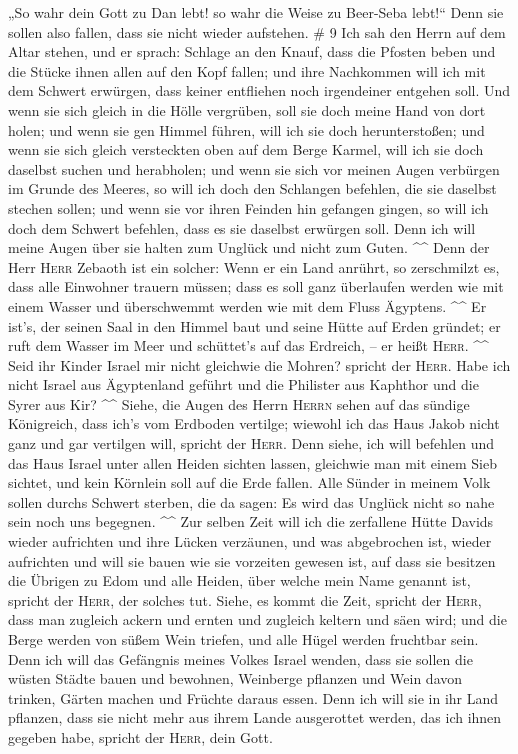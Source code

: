 „So wahr dein Gott zu Dan lebt! so wahr die Weise zu Beer-Seba lebt!{}``
Denn sie sollen also fallen, dass sie nicht wieder aufstehen. \# 9
 Ich sah den Herrn auf dem Altar stehen, und er sprach:
Schlage an den Knauf, dass die Pfosten beben und die Stücke ihnen allen
auf den Kopf fallen; und ihre Nachkommen will ich mit dem Schwert
erwürgen, dass keiner entfliehen noch irgendeiner entgehen soll.
 Und wenn sie sich gleich in die Hölle vergrüben, soll sie
doch meine Hand von dort holen; und wenn sie gen Himmel führen, will ich
sie doch herunterstoßen;  und wenn sie sich gleich
versteckten oben auf dem Berge Karmel, will ich sie doch daselbst suchen
und herabholen; und wenn sie sich vor meinen Augen verbürgen im Grunde
des Meeres, so will ich doch den Schlangen befehlen, die sie daselbst
stechen sollen;  und wenn sie vor ihren Feinden hin
gefangen gingen, so will ich doch dem Schwert befehlen, dass es sie
daselbst erwürgen soll. Denn ich will meine Augen über sie halten zum
Unglück und nicht zum Guten. \^{}\^{}  Denn der Herr
\textsc{Herr} Zebaoth ist ein solcher: Wenn er ein Land anrührt, so
zerschmilzt es, dass alle Einwohner trauern müssen; dass es soll ganz
überlaufen werden wie mit einem Wasser und überschwemmt werden wie mit
dem Fluss Ägyptens. \^{}\^{}  Er ist's, der seinen Saal in
den Himmel baut und seine Hütte auf Erden gründet; er ruft dem Wasser im
Meer und schüttet's auf das Erdreich, -- er heißt \textsc{Herr}.
\^{}\^{}  Seid ihr Kinder Israel mir nicht gleichwie die
Mohren? spricht der \textsc{Herr}. Habe ich nicht Israel aus Ägyptenland
geführt und die Philister aus Kaphthor und die Syrer aus Kir? \^{}\^{}
 Siehe, die Augen des Herrn \textsc{Herrn} sehen auf das
sündige Königreich, dass ich's vom Erdboden vertilge; wiewohl ich das
Haus Jakob nicht ganz und gar vertilgen will, spricht der \textsc{Herr}.
 Denn siehe, ich will befehlen und das Haus Israel unter
allen Heiden sichten lassen, gleichwie man mit einem Sieb sichtet, und
kein Körnlein soll auf die Erde fallen.  Alle Sünder in
meinem Volk sollen durchs Schwert sterben, die da sagen: Es wird das
Unglück nicht so nahe sein noch uns begegnen. \^{}\^{} 
Zur selben Zeit will ich die zerfallene Hütte Davids wieder aufrichten
und ihre Lücken verzäunen, und was abgebrochen ist, wieder aufrichten
und will sie bauen wie sie vorzeiten gewesen ist,  auf
dass sie besitzen die Übrigen zu Edom und alle Heiden, über welche mein
Name genannt ist, spricht der \textsc{Herr}, der solches tut.
 Siehe, es kommt die Zeit, spricht der \textsc{Herr},
dass man zugleich ackern und ernten und zugleich keltern und säen wird;
und die Berge werden von süßem Wein triefen, und alle Hügel werden
fruchtbar sein.  Denn ich will das Gefängnis meines
Volkes Israel wenden, dass sie sollen die wüsten Städte bauen und
bewohnen, Weinberge pflanzen und Wein davon trinken, Gärten machen und
Früchte daraus essen.  Denn ich will sie in ihr Land
pflanzen, dass sie nicht mehr aus ihrem Lande ausgerottet werden, das
ich ihnen gegeben habe, spricht der \textsc{Herr}, dein Gott.
